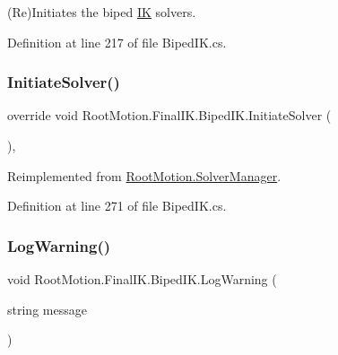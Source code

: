 (Re)Initiates the biped \mbox{\hyperlink{class_root_motion_1_1_final_i_k_1_1_i_k}{IK}} solvers. 



Definition at line 217 of file Biped\+I\+K.\+cs.

\mbox{\label{class_root_motion_1_1_final_i_k_1_1_biped_i_k_aa051dcb53a03e693210670bd530e9acd}} 
\subsubsection{\texorpdfstring{Initiate\+Solver()}{InitiateSolver()}}
{\footnotesize\ttfamily override void Root\+Motion.\+Final\+I\+K.\+Biped\+I\+K.\+Initiate\+Solver (\begin{DoxyParamCaption}{ }\end{DoxyParamCaption})\hspace{0.3cm}{\ttfamily [protected]}, {\ttfamily [virtual]}}



Reimplemented from \mbox{\hyperlink{class_root_motion_1_1_solver_manager_abd2008369f3de95712d5748aa4ce6243}{Root\+Motion.\+Solver\+Manager}}.



Definition at line 271 of file Biped\+I\+K.\+cs.

\mbox{\label{class_root_motion_1_1_final_i_k_1_1_biped_i_k_a3cf71da9ed6cce26b07391960d3b42f3}} 
\subsubsection{\texorpdfstring{Log\+Warning()}{LogWarning()}}
{\footnotesize\ttfamily void Root\+Motion.\+Final\+I\+K.\+Biped\+I\+K.\+Log\+Warning (\begin{DoxyParamCaption}\item[{string}]{message }\end{DoxyParamCaption})}



